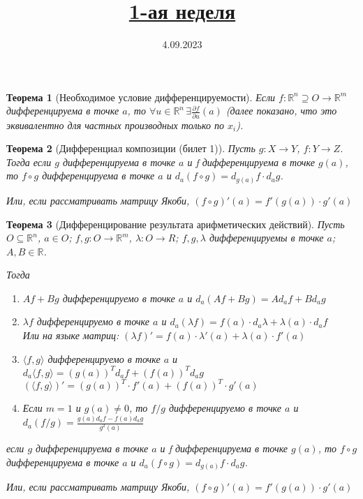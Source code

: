 \documentclass[11pt,a4paper,oneside]{scrartcl}
\title{\href{https://www.youtube.com/live/0p9G5WBcDqs?si=1_87BezxIHYyR8rZ}{1-ая неделя}}
\date{4.09.2023}
\newtheorem{theorem}{Теорема}
\begin{document}
\pagestyle{empty}

\maketitle

\begin{theorem}[Необходимое условие дифференцируемости]
    Если $f: \mathbb{R}^n \supseteq O \rightarrow \mathbb{R}^m$
    дифференцируема в точке $a$,
    то $\forall u \in \mathbb{R}^n \, \exists \frac{\partial f}{\partial u}(a)$
    (далее показано, что это эквивалентно для частных производных только по $x_i$).
\end{theorem}

\begin{theorem}[Дифференциал композиции (билет 1)]    %
    Пусть $g: X \rightarrow Y$, $f: Y \rightarrow Z$.
    Тогда если $g$ дифференцируема в точке $a$
    и f дифференцируема в точке $g(a)$,
    то $f \circ g$ дифференцируема в точке $a$
    и $d_a (f \circ g) = d_{g(a)} f \cdot d_a g$.

    Или, если рассматривать матрицу Якоби, $(f \circ g)'(a) = f'(g(a)) \cdot g'(a)$
\end{theorem}

\begin{theorem}[Дифференцирование результата арифметических действий]    %
    Пусть $O \subseteq \mathbb{R}^n$, $a \in O$;
    $f, g: O \rightarrow \mathbb{R}^m$, $\lambda: O \rightarrow R$;
    $f, g, \lambda$ дифференцируемы в точке $a$;
    $A, B \in \mathbb{R}$.

    Тогда \begin{enumerate}
              \item $Af + Bg$ дифференцируемо в точке $a$ и $d_a (Af + Bg) = Ad_a f + Bd_a g$
              \item $\lambda f$ дифференцируемо в точке $a$
                и $d_a (\lambda f) = f(a) \cdot d_a \lambda + \lambda(a) \cdot d_a f$ \\
                Или на языке матриц:
                    $(\lambda f)' = f(a) \cdot \lambda'(a) + \lambda(a) \cdot f'(a) $
              \item $\langle f, g \rangle$ дифференцируемо в точке $a$ и
                $d_a \langle f, g \rangle = (g(a))^T d_a f + (f(a))^T d_a g $ \\
                $(\langle f, g \rangle)' = (g(a))^T \cdot f'(a) + (f(a))^T \cdot g'(a)$
              \item Если $m = 1$ и $g(a) \neq 0$, то $f / g$ дифференцируемо в точке $a$
                и $d_a (f / g) = \frac{g(a)d_a f - f(a)d_a g}{g^2(a)}$
    \end{enumerate}
    если $g$ дифференцируема в точке $a$
    и f дифференцируема в точке $g(a)$,
    то $f \circ g$ дифференцируема в точке $a$
    и $d_a (f \circ g) = d_{g(a)} f \cdot d_a g$.

    Или, если рассматривать матрицу Якоби, $(f \circ g)'(a) = f'(g(a)) \cdot g'(a)$
\end{theorem}
\end{document}

